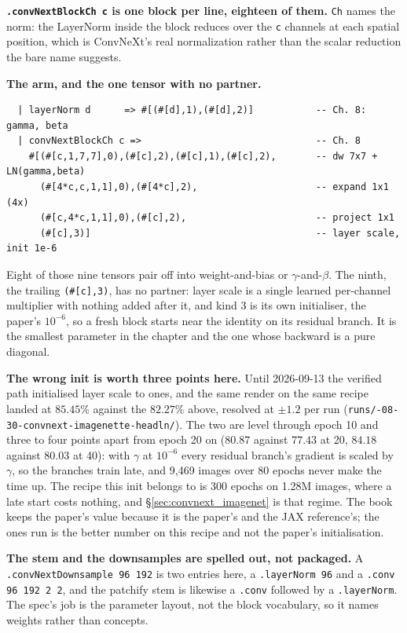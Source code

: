 \textbf{\texttt{.convNextBlockCh c} is one block per line, eighteen of
them.} \texttt{Ch} names the norm: the LayerNorm inside the block reduces over
the \texttt{c} channels at each spatial position, which is ConvNeXt's
real normalization rather than the scalar reduction the bare name
suggests.

\textbf{The arm, and the one tensor with no partner.}

\begin{verbatim}
  | layerNorm d      => #[(#[d],1),(#[d],2)]           -- Ch. 8: gamma, beta
  | convNextBlockCh c =>                               -- Ch. 8
    #[(#[c,1,7,7],0),(#[c],2),(#[c],1),(#[c],2),       -- dw 7x7 + LN(gamma,beta)
      (#[4*c,c,1,1],0),(#[4*c],2),                     -- expand 1x1 (4x)
      (#[c,4*c,1,1],0),(#[c],2),                       -- project 1x1
      (#[c],3)]                                        -- layer scale, init 1e-6
\end{verbatim}

\noindent Eight of those nine tensors pair off into weight-and-bias or
$\gamma$-and-$\beta$. The ninth, the trailing \texttt{(\#[c],3)}, has no
partner: layer scale is a single learned per-channel multiplier with
nothing added after it, and kind 3 is its own initialiser, the paper's
$10^{-6}$, so a fresh block starts near the identity on its residual
branch. It is the smallest parameter in the chapter and the one whose
backward is a pure diagonal.

\textbf{The wrong init is worth three points here.} Until
2026-09-13 the verified path initialised layer scale to ones, and the same
render on the same recipe landed at $85.45\%$ against the $82.27\%$
above, resolved at $\pm 1.2$ per run
(\texttt{runs/-08-30-\allowbreak convnext-imagenette-headln/}). The two are level through
epoch 10 and three to four points apart from epoch 20 on ($80.87$ against
$77.43$ at 20, $84.18$ against $80.03$ at 40): with $\gamma$ at $10^{-6}$
every residual branch's gradient is scaled by $\gamma$, so the branches
train late, and 9,469 images over 80 epochs never make the time up. The
recipe this init belongs to is 300 epochs on 1.28M images, where a late
start costs nothing, and \S\ref{sec:convnext_imagenet} is that regime.
The book keeps the paper's value because it is the paper's and the JAX
reference's; the ones run is the better number on this recipe and not the
paper's initialisation.

\textbf{The stem and the downsamples are spelled out, not packaged.} A
\texttt{.convNextDownsample 96 192} is two entries here, a
\texttt{.layerNorm 96} and a \texttt{.conv 96 192 2 2}, and the patchify
stem is likewise a \texttt{.conv} followed by a \texttt{.layerNorm}. The
spec's job is the parameter layout, not the block vocabulary, so
it names weights rather than concepts.

